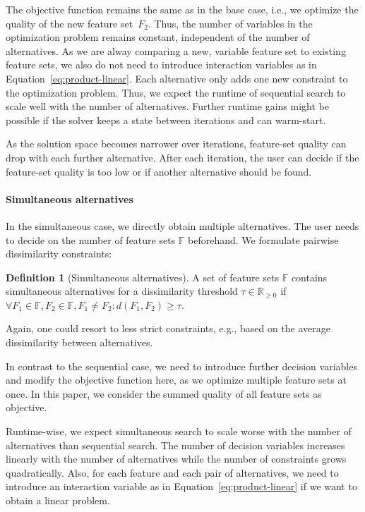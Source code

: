 \documentclass{article}
\theoremstyle{definition}
\newtheorem{definition}{Definition}
\begin{document}
The objective function remains the same as in the base case, i.e., we optimize the quality of the new feature set~$F_2$.
Thus, the number of variables in the optimization problem remains constant, independent of the number of alternatives.
As we are alway comparing a new, variable feature set to existing feature sets, we also do not need to introduce interaction variables as in Equation~\ref{eq:product-linear}.
Each alternative only adds one new constraint to the optimization problem.
Thus, we expect the runtime of sequential search to scale well with the number of alternatives.
Further runtime gains might be possible if the solver keeps a state between iterations and can warm-start.

As the solution space becomes narrower over iterations, feature-set quality can drop with each further alternative.
After each iteration, the user can decide if the feature-set quality is too low or if another alternative should be found.

\paragraph{Simultaneous alternatives}

In the simultaneous case, we directly obtain multiple alternatives.
The user needs to decide on the number of feature sets $\mathbb{F}$ beforehand.
We formulate pairwise dissimilarity constraints:
%
\begin{definition}[Simultaneous alternatives]
	A set of feature sets $\mathbb{F}$ contains simultaneous alternatives for a dissimilarity threshold $\tau \in \mathbb{R}_{\geq 0}$ if $\forall F_1 \in \mathbb{F}, F_2 \in \mathbb{F}, F_1 \neq F_2: d(F_1,F_2) \geq \tau$.
	\label{def:simultaneous-alternative}
\end{definition}
%
Again, one could resort to less strict constraints, e.g., based on the average dissimilarity between alternatives.

In contrast to the sequential case, we need to introduce further decision variables and modify the objective function here, as we optimize multiple feature sets at once.
In this paper, we consider the summed quality of all feature sets as objective.

Runtime-wise, we expect simultaneous search to scale worse with the number of alternatives than sequential search.
The number of decision variables increases linearly with the number of alternatives while the number of constraints grows quadratically.
Also, for each feature and each pair of alternatives, we need to introduce an interaction variable as in Equation~\ref{eq:product-linear} if we want to obtain a linear problem.
\end{document}
